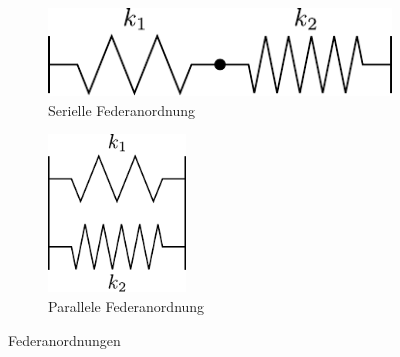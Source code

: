 \begin{figure}[h!]
        \centering
        \begin{subfigure}[c]{0.4\textwidth}
		\centering
                \includegraphics[width=\textwidth]{feder-seriell.pdf}
                \caption{Serielle Federanordnung}
                \label{fig:serielle_feder}
        \end{subfigure}%
        \begin{subfigure}[c]{0.4\textwidth}
		\centering
                \includegraphics[width=0.4\textwidth]{feder-parallel.pdf}
                \caption{Parallele Federanordnung}
                \label{fig:parallele_feder}
        \end{subfigure}
        \caption{Federanordnungen}\label{fig:federanordnung}
\end{figure}
